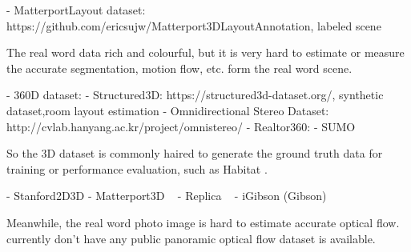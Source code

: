 - MatterportLayout dataset: https://github.com/ericsujw/Matterport3DLayoutAnnotation, labeled scene

The real word data rich and colourful, but it is very hard to estimate or measure the accurate segmentation, motion flow, etc. form the real word scene.

- 360D dataset:
- Structured3D: https://structured3d-dataset.org/, synthetic dataset,room layout estimation
- Omnidirectional Stereo Dataset: http://cvlab.hanyang.ac.kr/project/omnistereo/
- Realtor360: 
- SUMO

So the 3D dataset is commonly haired to generate the ground truth data for training or performance evaluation, such as Habitat \cite{SavvaKMZWJSLKMPB2019}.

- Stanford2D3D \cite{ArmenSZS2017}
- Matterport3D ~\cite{ChangDFHNSSZZ2017}
- Replica ~\cite{StrauWMCWGEMRVCYBYPYZLCBGMPSBSNGLN2019}
- iGibson (Gibson)


Meanwhile, the real word photo image is hard to estimate accurate optical flow.
 currently don't have any public panoramic optical flow dataset is available.
